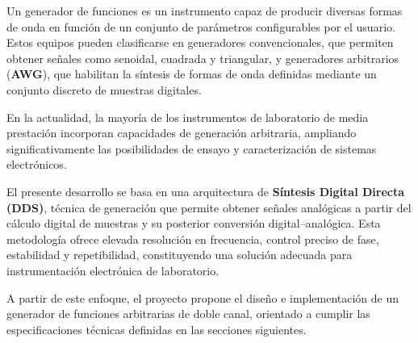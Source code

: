 Un generador de funciones es un instrumento capaz de producir diversas formas de onda en función de un conjunto de parámetros configurables por el usuario. Estos equipos pueden clasificarse en generadores convencionales, que permiten obtener señales como senoidal, cuadrada y triangular, y generadores arbitrarios (\textbf{AWG}), que habilitan la síntesis de formas de onda definidas mediante un conjunto discreto de muestras digitales.

En la actualidad, la mayoría de los instrumentos de laboratorio de media prestación incorporan capacidades de generación arbitraria, ampliando significativamente las posibilidades de ensayo y caracterización de sistemas electrónicos.

El presente desarrollo se basa en una arquitectura de \textbf{Síntesis Digital Directa (DDS)}, técnica de generación que permite obtener señales analógicas a partir del cálculo digital de muestras y su posterior conversión digital–analógica. Esta metodología ofrece elevada resolución en frecuencia, control preciso de fase, estabilidad y repetibilidad, constituyendo una solución adecuada para instrumentación electrónica de laboratorio.

A partir de este enfoque, el proyecto propone el diseño e implementación de un generador de funciones arbitrarias de doble canal, orientado a cumplir las especificaciones técnicas definidas en las secciones siguientes.



